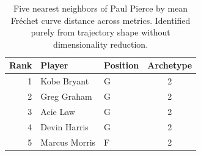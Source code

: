 \begin{table}[htbp]
  \centering\small
  \begin{tabular}{rllc}
    \toprule
    Rank & Player & Position & Archetype \\
    \midrule
    1 & Kobe Bryant & G & 2 \\
    2 & Greg Graham & G & 2 \\
    3 & Acie Law & G & 2 \\
    4 & Devin Harris & G & 2 \\
    5 & Marcus Morris & F & 2 \\
    \bottomrule
  \end{tabular}
  \caption{Five nearest neighbors of Paul Pierce by mean Fr\'{e}chet curve distance across metrics. Identified purely from trajectory shape without dimensionality reduction.}
  \label{tab:Paul_Pierce_frechet_curve_neighbors}
\end{table}

